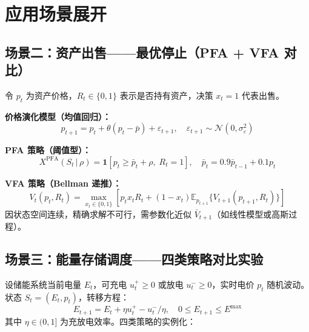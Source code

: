 \documentclass[11pt, a4paper]{article}
\begin{document}
\section{应用场景展开}

\subsection{场景二：资产出售——最优停止（PFA + VFA 对比）}

令 $p_t$ 为资产价格，$R_t \in \{0,1\}$ 表示是否持有资产，决策 $x_t=1$ 代表出售。

\noindent\textbf{价格演化模型（均值回归）：}
\begin{equation}
  p_{t+1} = p_t + \theta(p_t - \bar{p}) + \varepsilon_{t+1},\quad \varepsilon_{t+1} \sim \mathcal{N}(0, \sigma_\varepsilon^2)
\end{equation}

\noindent\textbf{PFA 策略（阈值型）：}
\begin{equation}
  X^{\text{PFA}}(S_t \,|\, \rho) = \mathbf{1}\!\left[p_t \geq \bar{p}_t + \rho,\; R_t = 1\right],
  \quad \bar{p}_t = 0.9\bar{p}_{t-1} + 0.1 p_t
\end{equation}

\noindent\textbf{VFA 策略（Bellman 递推）：}
\begin{equation}
  V_t(p_t, R_t) = \max_{x_t \in \{0,1\}}\!\left[p_t x_t R_t + (1-x_t)\mathbb{E}_{p_{t+1}}\!\{V_{t+1}(p_{t+1}, R_t)\}\right]
\end{equation}
因状态空间连续，精确求解不可行，需参数化近似 $\bar{V}_{t+1}$（如线性模型或高斯过程）。

\subsection{场景三：能量存储调度——四类策略对比实验}

设储能系统当前电量 $E_t$，可充电 $u_t^+ \geq 0$ 或放电 $u_t^- \geq 0$，实时电价 $p_t$ 随机波动。状态 $S_t = (E_t, p_t)$，转移方程：
\[
  E_{t+1} = E_t + \eta u_t^+ - u_t^-/\eta,\quad 0 \leq E_{t+1} \leq E^{\max}
\]
其中 $\eta \in (0,1]$ 为充放电效率。四类策略的实例化：
\end{document}
